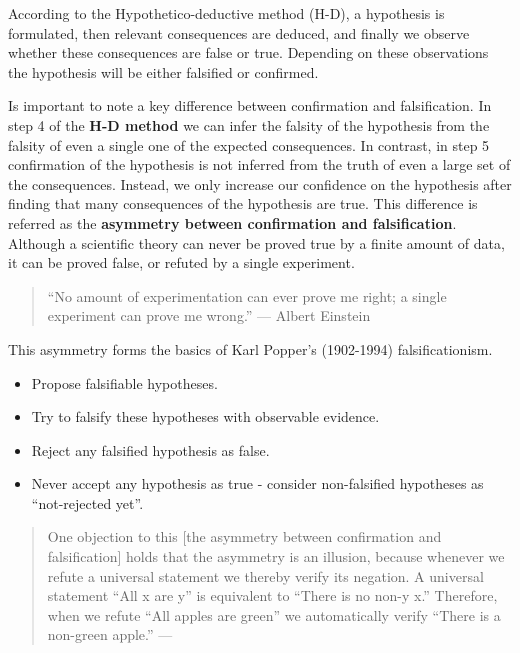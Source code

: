 \documentclass[
]{book}
\providecommand{\tightlist}{%
  \setlength{\itemsep}{0pt}\setlength{\parskip}{0pt}}
\begin{document}
According to the Hypothetico-deductive method (H-D), a hypothesis is formulated, then relevant consequences are deduced, and finally we observe whether these consequences are false or true. Depending on these observations the hypothesis will be either falsified or confirmed.

Is important to note a key difference between confirmation and falsification. In step 4 of the \textbf{H-D method} we can infer the falsity of the hypothesis from the falsity of even a single one of the expected consequences. In contrast, in step 5 confirmation of the hypothesis is not inferred from the truth of even a large set of the consequences. Instead, we only increase our confidence on the hypothesis after finding that many consequences of the hypothesis are true. This difference is referred as the \textbf{asymmetry between confirmation and falsification}. Although a scientific theory can never be proved true by a finite amount of data, it can be proved false, or refuted by a single experiment.

\begin{quote}
``No amount of experimentation can ever prove me right; a single experiment can prove me wrong.'' --- Albert Einstein
\end{quote}

This asymmetry forms the basics of Karl Popper's (1902-1994) falsificationism.

\begin{itemize}
\tightlist
\item
  Propose falsifiable hypotheses.
\item
  Try to falsify these hypotheses with observable evidence.
\item
  Reject any falsified hypothesis as false.
\item
  Never accept any hypothesis as true - consider non-falsified hypotheses as ``not-rejected yet''.
\end{itemize}

\begin{quote}
One objection to this {[}the asymmetry between confirmation and falsification{]} holds that the asymmetry is an illusion, because whenever we refute a universal statement we thereby verify its negation. A universal statement ``All x are y'' is equivalent to ``There is no non-y x.'' Therefore, when we refute ``All apples are green'' we automatically verify ``There is a non-green apple.'' --- \citep{percival2015confirmation}
\end{quote}
\end{document}
